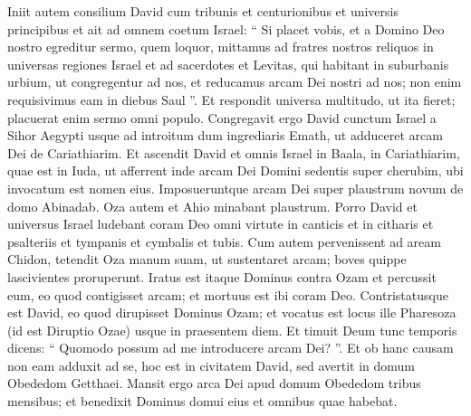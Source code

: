 \begin{biblechapter}
\begin{biblechapter}
\begin{biblechapter}
\begin{biblechapter}
\begin{biblechapter}
\begin{biblechapter}
\begin{biblechapter}
\begin{biblechapter}
\begin{biblechapter}
\begin{biblechapter}
\begin{biblechapter}
\begin{biblechapter}
\begin{biblechapter}
\verse Iniit autem consilium David cum tribunis et centurionibus et universis principibus 
\verse et ait ad omnem coetum Israel: “ Si placet vobis, et a Domino Deo nostro egreditur sermo, quem loquor, mittamus ad fratres nostros reliquos in universas regiones Israel et ad sacerdotes et Levitas, qui habitant in suburbanis urbium, ut congregentur ad nos, 
\verse et reducamus arcam Dei nostri ad nos; non enim requisivimus eam in diebus Saul ”. 
\verse Et respondit universa multitudo, ut ita fieret; placuerat enim sermo omni populo. 
\verse Congregavit ergo David cunctum Israel a Sihor Aegypti usque ad introitum dum ingrediaris Emath, ut adduceret arcam Dei de Cariathiarim. 
\verse Et ascendit David et omnis Israel in Baala, in Cariathiarim, quae est in Iuda, ut afferrent inde arcam Dei Domini sedentis super cherubim, ubi invocatum est nomen eius. 
\verse Imposueruntque arcam Dei super plaustrum novum de domo Abinadab. Oza autem et Ahio minabant plaustrum. 
\verse Porro David et universus Israel ludebant coram Deo omni virtute in canticis et in citharis et psalteriis et tympanis et cymbalis et tubis.
 \verse Cum autem pervenissent ad aream Chidon, tetendit Oza manum suam, ut sustentaret arcam; boves quippe lascivientes proruperunt. 
\verse Iratus est itaque Dominus contra Ozam et percussit eum, eo quod contigisset arcam; et mortuus est ibi coram Deo. 
\verse Contristatusque est David, eo quod dirupisset Dominus Ozam; et vocatus est locus ille Pharesoza (id est Diruptio Ozae) usque in praesentem diem. 
\verse Et timuit Deum tunc temporis dicens: “ Quomodo possum ad me introducere arcam Dei? ”. 
\verse Et ob hanc causam non eam adduxit ad se, hoc est in civitatem David, sed avertit in domum Obededom Getthaei. 
\verse Mansit ergo arca Dei apud domum Obededom tribus mensibus; et benedixit Dominus domui eius et omnibus quae habebat.
 

\end{biblechapter}
\end{biblechapter}
\end{biblechapter}
\end{biblechapter}
\end{biblechapter}
\end{biblechapter}
\end{biblechapter}
\end{biblechapter}
\end{biblechapter}
\end{biblechapter}
\end{biblechapter}
\end{biblechapter}
\end{biblechapter}
